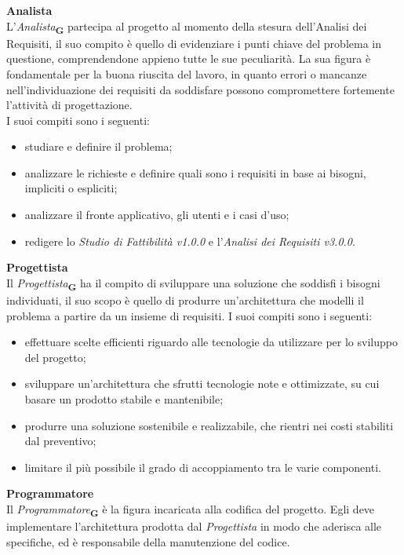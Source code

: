 \textbf{Analista}\\
L'\textit{Analista}\textsubscript{\textbf{G}} partecipa al progetto al momento della stesura dell'Analisi dei Requisiti, il suo compito è quello di evidenziare i punti chiave del problema in questione, comprendendone appieno tutte le sue peculiarità. La sua figura è fondamentale per la buona riuscita del lavoro, in quanto errori o mancanze nell'individuazione dei requisiti da soddisfare possono compromettere fortemente l'attività di progettazione.\\
I suoi compiti sono i seguenti:
\begin{itemize}
    \item studiare e definire il problema;
    \item analizzare le richieste e definire quali sono i requisiti in base ai bisogni, impliciti o espliciti;
    \item analizzare il fronte applicativo, gli utenti e i casi d’uso;
    \item redigere lo \textit{Studio di Fattibilità v1.0.0} e l’\textit{Analisi dei Requisiti v3.0.0}.
\end{itemize}
\textbf{Progettista}\\
Il \textit{Progettista}\textsubscript{\textbf{G}} ha il compito di sviluppare una soluzione che soddisfi i bisogni individuati, il suo scopo è quello di produrre un'architettura che modelli il problema a partire da un insieme di requisiti.
\newline
I suoi compiti sono i seguenti:
\begin{itemize}
    \item effettuare scelte efficienti riguardo alle tecnologie da utilizzare per lo sviluppo del progetto;
    \item sviluppare un'architettura che sfrutti tecnologie note e ottimizzate, su cui basare un prodotto stabile e mantenibile;
    \item produrre una soluzione sostenibile e realizzabile, che rientri nei costi stabiliti dal preventivo;
    \item limitare il più possibile il grado di accoppiamento tra le varie componenti.
\end{itemize}
\textbf{Programmatore}\\
Il \textit{Programmatore}\textsubscript{\textbf{G}} è la figura incaricata alla codifica del progetto. Egli deve implementare l’architettura prodotta dal \textit{Progettista} in modo che aderisca alle specifiche, ed è responsabile della manutenzione del codice.
\newline

